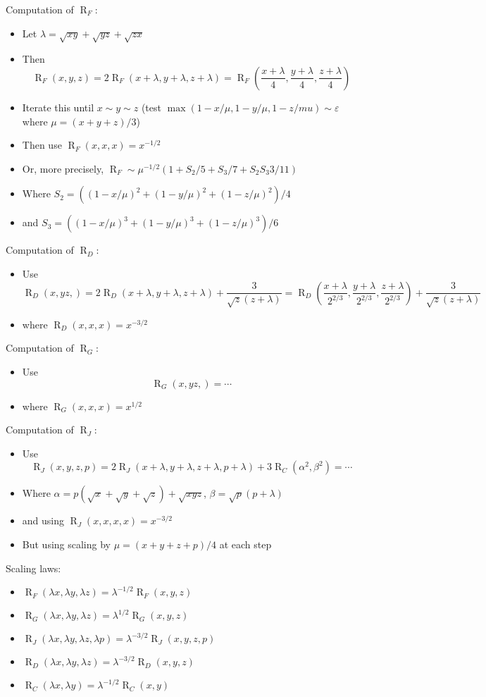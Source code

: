 \documentclass[10pt,dvipdfmx,letterpaper,twoside]{article}
\let\O=\operatorname
\let\al=\alpha
\let\eps=\varepsilon
\let\lam=\lambda
\begin{document}
Computation of $\O{R}_F$:
\begin{itemize}
  \item Let $\lam = \sqrt{xy}+\sqrt{yz}+\sqrt{zx}$
  \item Then
    \[ \O{R}_F(x,y,z) = 2\O{R}_F(x+\lam,y+\lam,z+\lam) = \O{R}_F(\frac{x+\lam}{4},\frac{y+\lam}{4},\frac{z+\lam}{4}) \]
  \item Iterate this until $x\sim y\sim z$ (test $\max(1-x/\mu,1-y/\mu,1-z/mu)\sim\eps$ where $\mu=(x+y+z)/3$)
  \item Then use $\O{R}_F(x,x,x)=x^{-1/2}$
  \item Or, more precisely, $\O{R}_F \sim \mu^{-1/2}\left(1+S_2/5+S_3/7+S_2 S_3 3/11\right)$
  \item Where $S_2 = \left( (1-x/\mu)^2+(1-y/\mu)^2+(1-z/\mu)^2\right)/4$
  \item and $S_3 = \left((1-x/\mu)^3+(1-y/\mu)^3+(1-z/\mu)^3\right)/6$
\end{itemize}

Computation of $\O{R}_D$:
\begin{itemize}
  \item Use
    \[ \O{R}_D(x,yz,) = 2 \O{R}_D(x+\lam,y+\lam,z+\lam) + \frac{3}{\sqrt{z}(z+\lam)}
      = \O{R}_D(\frac{x+\lam}{2^{2/3}},\frac{y+\lam}{2^{2/3}},\frac{z+\lam}{2^{2/3}}) + \frac{3}{\sqrt{z}(z+\lam)}\]
  \item where $\O{R}_D(x,x,x) = x^{-3/2}$
\end{itemize}

Computation of $\O{R}_G$:
\begin{itemize}
  \item Use
    \[ \O{R}_G(x,yz,) = \cdots \]
  \item where $\O{R}_G(x,x,x) = x^{1/2}$
\end{itemize}

Computation of $\O{R}_J$:
\begin{itemize}
  \item Use
    \[ \O{R}_J(x,y,z,p) = 2 \O{R}_J(x+\lam,y+\lam,z+\lam,p+\lam) + 3\O{R}_C(\al^2,\beta^2) = \cdots\]
  \item Where $\al=p(\sqrt{x}+\sqrt{y}+\sqrt{z}) + \sqrt{xyz}$, $\beta=\sqrt{p}(p+\lam)$
  \item and using $\O{R}_J(x,x,x,x) = x^{-3/2}$
  \item But using scaling by $\mu=(x+y+z+p)/4$ at each step
\end{itemize}

Scaling laws:
\begin{itemize}
  \item $\O{R}_F(\lam x,\lam y, \lam z) = \lam^{-1/2} \O{R}_F(x,y,z)$
  \item $\O{R}_G(\lam x,\lam y, \lam z) = \lam^{1/2} \O{R}_G(x,y,z)$
  \item $\O{R}_J(\lam x,\lam y, \lam z, \lam p) = \lam^{-3/2} \O{R}_J(x,y,z,p)$
  \item $\O{R}_D(\lam x,\lam y, \lam z) = \lam^{-3/2} \O{R}_D(x,y,z)$
  \item $\O{R}_C(\lam x,\lam y) = \lam^{-1/2} \O{R}_C(x,y)$
\end{itemize}
\end{document}
